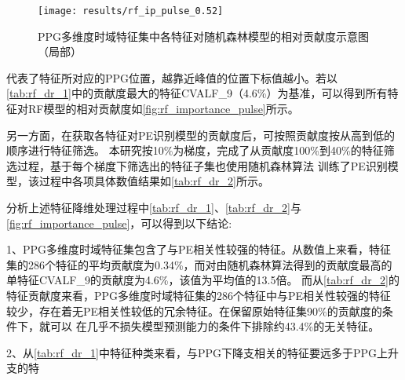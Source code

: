 \begin{figure}[htbp]
    \centering
    \texttt{[image: results/rf\_ip\_pulse\_0.52]}
    \caption[PPG多维度时域特征集中各特征对随机森林模型的相对贡献度示意图（局部）]{\label{fig:rf_importance_pulse}PPG多维度时域特征集中各特征对随机森林模型的相对贡献度示意图（局部）}
\end{figure}

\noindent
代表了特征所对应的PPG位置，越靠近峰值的位置下标值越小。若以\autoref{tab:rf_dr_1}中的贡献度最大的特征CVALF\_9（4.6\%）为基准，可以得到所有特征对RF模型的相对贡献度如\autoref{fig:rf_importance_pulse}所示。

另一方面，在获取各特征对PE识别模型的贡献度后，可按照贡献度按从高到低的顺序进行特征筛选。
本研究按10\%为梯度，完成了从贡献度100\%到40\%的特征筛选过程，基于每个梯度下筛选出的特征子集也使用随机森林算法
训练了PE识别模型，该过程中各项具体数值结果如\autoref{tab:rf_dr_2}所示。

分析上述特征降维处理过程中\autoref{tab:rf_dr_1}、\autoref{tab:rf_dr_2}与\autoref{fig:rf_importance_pulse}，可以得到以下结论:

1、PPG多维度时域特征集包含了与PE相关性较强的特征。从数值上来看，特征集的286个特征的平均贡献度为0.34\%，而对由随机森林算法得到的贡献度最高的单特征CVALF\_9的贡献度为4.6\%，该值为平均值的13.5倍。
而从\autoref{tab:rf_dr_2}的特征贡献度来看，PPG多维度时域特征集的286个特征中与PE相关性较强的特征较少，存在着无PE相关性较低的冗余特征。在保留原始特征集90\%的贡献度的条件下，就可以
在几乎不损失模型预测能力的条件下排除约43.4\%的无关特征。

2、从\autoref{tab:rf_dr_1}中特征种类来看，与PPG下降支相关的特征要远多于PPG上升支的特


